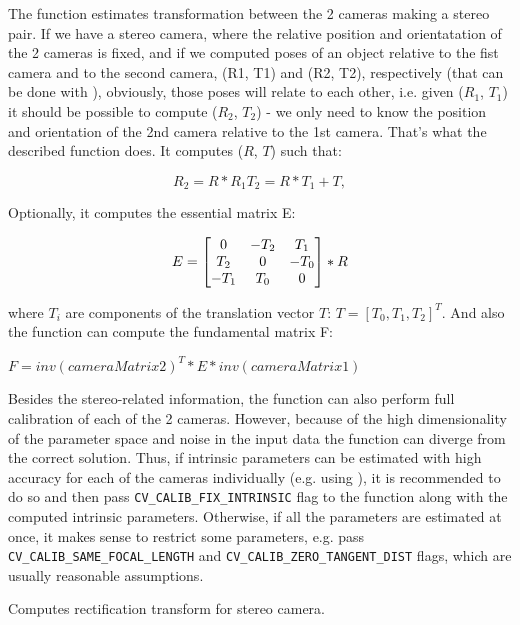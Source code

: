 The function estimates transformation between the 2 cameras making a stereo pair. If we have a stereo camera, where the relative position and orientatation of the 2 cameras is fixed, and if we computed poses of an object relative to the fist camera and to the second camera, (R1, T1) and (R2, T2), respectively (that can be done with ), obviously, those poses will relate to each other, i.e. given ($R_1$, $T_1$) it should be possible to compute ($R_2$, $T_2$) - we only need to know the position and orientation of the 2nd camera relative to the 1st camera. That's what the described function does. It computes ($R$, $T$) such that:

\[
R_2=R*R_1
T_2=R*T_1 + T,
\]

Optionally, it computes the essential matrix E:

\[
E=
\begin{bmatrix} 0 & -T_2 & T_1\\ T_2 & 0 & -T_0\\ -T_1 & T_0 & 0 \end{bmatrix}
*R
\]

where $T_i$ are components of the translation vector $T$: $T=[T_0, T_1, T_2]^T$. And also the function can compute the fundamental matrix F:

$F = inv(cameraMatrix2)^T*E*inv(cameraMatrix1)$

Besides the stereo-related information, the function can also perform full calibration of each of the 2 cameras. However, because of the high dimensionality of the parameter space and noise in the input data the function can diverge from the correct solution. Thus, if intrinsic parameters can be estimated with high accuracy for each of the cameras individually (e.g. using ), it is recommended to do so and then pass \texttt{CV\_CALIB\_FIX\_INTRINSIC} flag to the function along with the computed intrinsic parameters. Otherwise, if all the parameters are estimated at once, it makes sense to restrict some parameters, e.g. pass \texttt{CV\_CALIB\_SAME\_FOCAL\_LENGTH} and \texttt{CV\_CALIB\_ZERO\_TANGENT\_DIST} flags, which are usually reasonable assumptions. 

Computes rectification transform for stereo camera.

